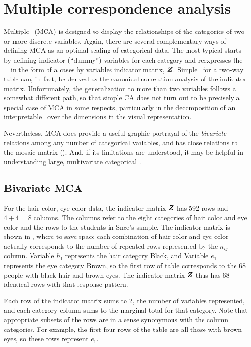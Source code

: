 \section{Multiple correspondence analysis}\label{sec:mca}

Multiple \CA\ (MCA) is designed to display the relationships of the categories
of two or more discrete variables.  Again, there are several complementary
ways of defining MCA as an optimal scaling of categorical data.
The most typical starts by defining indicator (``dummy'') variables
for each category and reexpresses the \nway\ \ctab\ in the form
of a cases by variables indicator matrix, $\bm{Z}$.
Simple \CA\ for a two-way table can, in fact, be derived as the
canonical correlation analysis of the indicator matrix.
Unfortunately, the generalization to more than two variables follows
a somewhat different path, so that simple CA does not turn out to be
precisely a special case of MCA in some respects, particularly in the
decomposition of an interpretable \chisq\ over the dimensions in
the visual representation.

Nevertheless, MCA does provide a useful graphic portrayal of the
\emph{bivariate} relations among any number of categorical variables,
and has close relations to the mosaic matrix ().
And, if its limitations are understood, it may be helpful in
understanding large, multivariate categorical \Dsets.

\subsection{Bivariate MCA}\label{sec:mca-bi}
For the hair color, eye color data, the indicator matrix $\bm{Z}$
has 592 rows and $4+4=8$ columns.  The columns refer to the eight
categories of hair color and eye color and the rows to the students
in Snee's \citeyear{Snee:74} sample.
The indicator matrix is shown in , where
to save space each combination of hair color and eye color actually
corresponds to the number of repeated rows represented by the $n_{ij}$
column.
Variable $h_1$ represents the hair category Black, and
Variable $e_1$ represents the eye category Brown,
so the first row of table 
corresponds to the 68 people with black hair and brown eyes.
The indicator matrix $\bm{Z}$ thus has 68 identical rows with that response
pattern.


Each row of the indicator matrix sums to 2, the number of variables
represented, and each category column sums to the marginal total for
that category.
Note that appropriate subsets of the rows are in a sense synonymous with
the column categories.  For example, the first four rows of the table
are all those with brown eyes, so these rows represent $e_1$.

